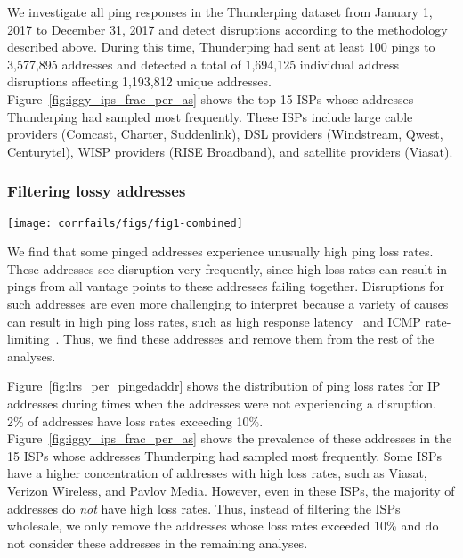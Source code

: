 We investigate all ping responses in the Thunderping dataset from
January 1, 2017 to December 31, 2017 and detect disruptions according
to the methodology described above.
%
During this time, Thunderping had sent at least 100 pings to 3,577,895
addresses and detected a total of 1,694,125 individual address
disruptions affecting 1,193,812 unique addresses.
%
Figure~\ref{fig:iggy_ips_frac_per_as} shows the top 15 ISPs whose
addresses Thunderping had sampled most frequently.
%
These ISPs include large cable providers (Comcast, Charter,
Suddenlink), DSL providers (Windstream, Qwest, Centurytel), WISP
providers (RISE Broadband), and satellite providers (Viasat).


\subsubsection*{Filtering lossy addresses}

\begin{figure*}[t]
\texttt{[image: corrfails/figs/fig1-combined]}
\caption[Filtering lossy addresses]{
\label{fig:lr}
\label{fig:lrs_per_pingedaddr}
\label{fig:iggy_ips_frac_per_as}
(Left)~The distribution of ping loss rates per IP address during times when Thunderping believed an
address was \emph{not} experiencing a disruption. While most addresses
have low loss rates, 2\% of addresses had loss rates exceeding
10\%. 
(Right)~The fraction of addresses per ISP with ping loss rates exceeding 10\%
during non-disruption periods, for the 15 ISPs with the most pinged
addresses. We filter from all remaining analyses any address whose
loss rate exceeded 10\%.
}
\end{figure*}

We find that some pinged addresses experience unusually high ping loss
rates. These addresses see disruption very frequently, since high loss
rates can result in pings from all vantage points to these addresses failing together. Disruptions for
such addresses are even more challenging to interpret because a variety
of causes can result in high ping loss rates, such as high response
latency~\cite{timeouts} and ICMP
rate-limiting~\cite{icmp-rate-limiting-pam18}. Thus, we find these
addresses and remove them from the rest of the analyses.

Figure~\ref{fig:lrs_per_pingedaddr} shows the distribution of ping
loss rates for IP addresses during times when the addresses were not
experiencing a disruption. 2\% of addresses have loss rates exceeding
10\%. Figure~\ref{fig:iggy_ips_frac_per_as} shows the prevalence of
these addresses in the 15 ISPs whose addresses Thunderping had sampled
most frequently. Some ISPs have a higher concentration of addresses
with high loss rates, such as Viasat, Verizon Wireless, and Pavlov
Media. However, even in these ISPs, the majority of addresses do
\emph{not} have high loss rates. Thus, instead of filtering the ISPs
wholesale, we only remove the addresses whose loss rates exceeded 10\%
and do not consider these addresses in the remaining analyses.

